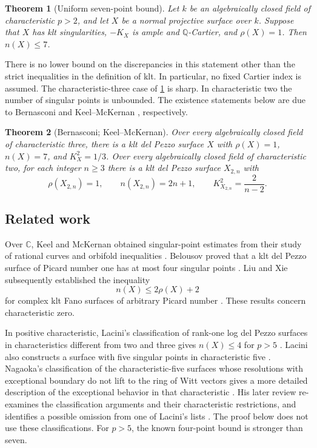 \documentclass[11pt,reqno]{amsart}
\newtheorem{theorem}{Theorem}[section]
\theoremstyle{definition}
\theoremstyle{remark}
\newcommand{\QQ}{\mathbb Q}
\numberwithin{equation}{section}
\begin{document}
\begin{theorem}[Uniform seven-point bound]\label{thm:main}
Let $k$ be an algebraically closed field of characteristic $p>2$, and let
$X$ be a normal projective surface over $k$. Suppose that $X$ has klt
singularities, $-K_X$ is ample and $\QQ$-Cartier, and $\rho(X)=1$.
Then $n(X)\le7$.
\end{theorem}

There is no lower bound on the discrepancies in this statement other
than the strict inequalities in the definition of klt. In particular,
no fixed Cartier index is assumed. The characteristic-three case of
\cref{thm:main} is sharp. In characteristic two the number of singular
points is unbounded. The existence statements below are due to Bernasconi
\cite[Section~3.1 and Proposition~3.2]{Bernasconi} and Keel--McKernan
\cite[Section~9]{KeelMcKernan}, respectively.

\begin{theorem}[Bernasconi; Keel--McKernan]\label{thm:examples}
Over every algebraically closed field of characteristic three, there is
a klt del Pezzo surface $X$ with $\rho(X)=1$, $n(X)=7$, and $K_X^2=1/3$.
Over every algebraically closed field of characteristic two, for each
integer $n\ge3$ there is a klt del Pezzo surface $X_{2,n}$ with
\[
 \rho(X_{2,n})=1,\qquad n(X_{2,n})=2n+1,\qquad
 K_{X_{2,n}}^2=\frac{2}{n-2}.
\]
\end{theorem}

\subsection{Related work}\label{subsec:related-work}
Over $\mathbb C$, Keel and McKernan obtained
singular-point estimates from their study of rational curves and
orbifold inequalities \cite[Section~9]{KeelMcKernan}. Belousov proved
that a klt del Pezzo surface of Picard number one has at most four
singular points \cite[Theorem~1.1]{Belousov}. Liu and Xie subsequently
established the inequality
\[
 n(X)\le 2\rho(X)+2
\]
for complex klt Fano surfaces of arbitrary Picard number
\cite[Theorem~1.2]{LiuXie}. These results concern characteristic zero.

In positive characteristic, Lacini's classification of rank-one log del
Pezzo surfaces in characteristics different from two and three gives
$n(X)\le4$ for $p>5$ \cite[Corollary~1.2]{Lacini}. Lacini also constructs a surface with five singular points in
characteristic five \cite[Theorem~1.3 and Example~7.6]{Lacini}. Nagaoka's classification of the
characteristic-five surfaces whose resolutions with exceptional
boundary do not lift to the ring of Witt vectors gives a more detailed
description of the exceptional behavior in that characteristic
\cite{NagaokaFive}. His later review re-examines the classification
arguments and their characteristic restrictions, and identifies a
possible omission from one of Lacini's lists \cite{NagaokaReview}.
The proof below does not use these classifications. For $p>5$, the known four-point bound is stronger than seven.
\end{document}
